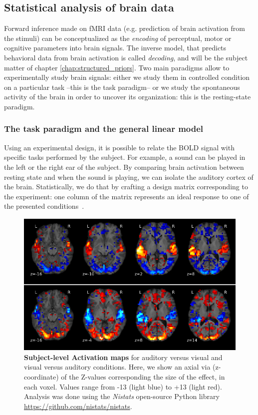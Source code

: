 \subsection{Statistical analysis of brain data}
\label{sec:glm}
Forward inference made on fMRI data (e.g. prediction of brain
activation from the stimuli) can be conceptualized as the \textit{encoding} of perceptual,
motor or cognitive parameters into brain signals. The inverse model, that
predicts behavioral data from brain activation is called \textit{decoding}, and will be the subject matter of chapter \ref{chap:structured_priors}. Two main paradigms allow to experimentally study brain
signals: either we study them in controlled condition on a particular task
--this is the task paradigm-- or we study the spontaneous activity of the brain in
order to uncover its organization: this is the resting-state paradigm.

\subsubsection{The task paradigm and the general linear model}
Using an experimental design, it is possible to relate the BOLD signal with
specific tasks performed by the subject. For example, a sound can be played in
the left or the right ear of the subject. By comparing brain activation between
resting state and when the sound is playing, we can isolate the auditory cortex
of the brain.
Statistically, we do that by crafting a design matrix corresponding to the
experiment: one column of the matrix represents an ideal response to one of the presented conditions~\citep{friston1994statistical}.

\begin{figure}
  \includegraphics[width=1\linewidth]{figures/activation.png}
  \caption{\textbf{Subject-level Activation maps } for auditory versus visual and visual versus auditory conditions. Here, we show an axial via (z-coordinate) of the Z-values corresponding the size of the effect, in each voxel. Values range from -13 (light blue) to +13 (light red). Analysis was done using the \textit{Nistats} open-source Python library \url{https://github.com/nistats/nistats}.}
\end{figure}


